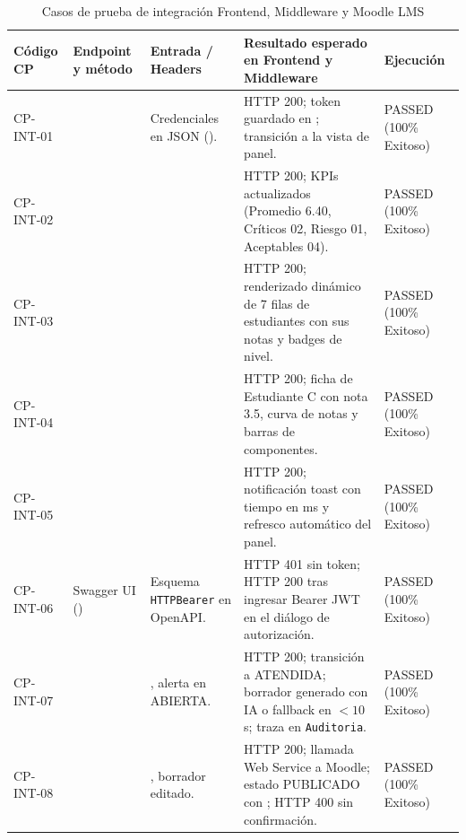 \documentclass[11pt,a4paper]{article}
\newcommand{\hd}[1]{\textbf{#1}}
\begin{document}
\begin{table}[H]
\centering\small
\caption{Casos de prueba de integración Frontend, Middleware y Moodle LMS}
\label{tab:cp_integracion}
\begin{tabularx}{\textwidth}{|R{1.6cm}|R{3.8cm}|R{2.8cm}|Y|R{1.8cm}|}
\hline
\hd{Código CP} & \hd{Endpoint y método} & \hd{Entrada / Headers} & \hd{Resultado esperado en Frontend y Middleware} & \hd{Ejecución}\\ \hline
\footnotesize CP-INT-01 & \footnotesize {} & \footnotesize Credenciales en JSON (). & \footnotesize HTTP 200; token guardado en ; transición a la vista de panel. & \footnotesize PASSED (100\% Exitoso)\\ \hline
\footnotesize CP-INT-02 & \footnotesize {} & \footnotesize {} & \footnotesize HTTP 200; KPIs actualizados (Promedio 6.40, Críticos 02, Riesgo 01, Aceptables 04). & \footnotesize PASSED (100\% Exitoso)\\ \hline
\footnotesize CP-INT-03 & \footnotesize {} & \footnotesize {} & \footnotesize HTTP 200; renderizado dinámico de 7 filas de estudiantes con sus notas y badges de nivel. & \footnotesize PASSED (100\% Exitoso)\\ \hline
\footnotesize CP-INT-04 & \footnotesize {} & \footnotesize {} & \footnotesize HTTP 200; ficha de Estudiante C con nota 3.5, curva de notas y barras de componentes. & \footnotesize PASSED (100\% Exitoso)\\ \hline
\footnotesize CP-INT-05 & \footnotesize {} & \footnotesize {} & \footnotesize HTTP 200; notificación toast con tiempo en ms y refresco automático del panel. & \footnotesize PASSED (100\% Exitoso)\\ \hline
\footnotesize CP-INT-06 & \footnotesize Swagger UI () & \footnotesize Esquema \texttt{HTTPBearer} en OpenAPI. & \footnotesize HTTP 401 sin token; HTTP 200 tras ingresar Bearer JWT en el diálogo de autorización. & \footnotesize PASSED (100\% Exitoso)\\ \hline
\footnotesize CP-INT-07 & \footnotesize {} & \footnotesize {}, alerta en ABIERTA. & \footnotesize HTTP 200; transición a ATENDIDA; borrador generado con IA o fallback en $<10$ s; traza en \texttt{Auditoria}. & \footnotesize PASSED (100\% Exitoso)\\ \hline
\footnotesize CP-INT-08 & \footnotesize {} & \footnotesize {}, borrador editado. & \footnotesize HTTP 200; llamada Web Service a Moodle; estado PUBLICADO con ; HTTP 400 sin confirmación. & \footnotesize PASSED (100\% Exitoso)\\ \hline
\end{tabularx}
\end{table}
\end{document}
